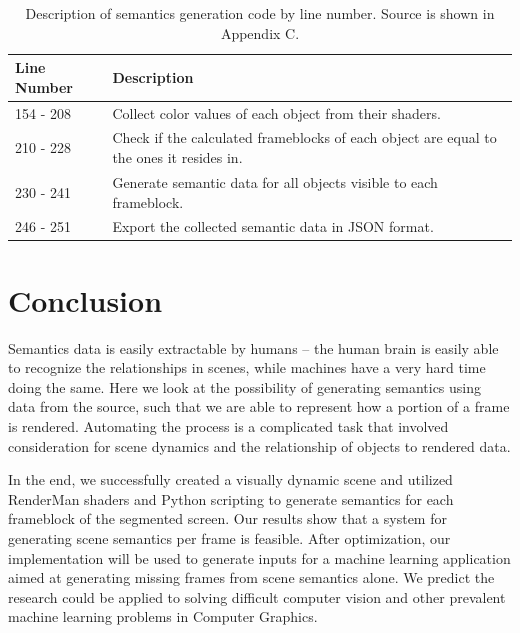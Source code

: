 \documentclass[conference]{IEEEtran}
\begin{document}
\begin{table}[t]
\begin{centering}
\bgroup
\def\arraystretch{1.5}
\begin{tabular}{| m{} | m{} |} 
\hline
Line Number & Description \\ 
\hline
\hline
154 - 208 & Collect color values of each object from their shaders. \\
210 - 228 & Check if the calculated frameblocks of each object are equal to the ones it
resides in. \\
230 - 241 & Generate semantic data for all objects visible to each frameblock. \\
246 - 251 & Export the collected semantic data in JSON format. \\
\hline
\end{tabular}
\caption{Description of semantics generation code by line number.
Source is shown in Appendix C.}
\label{tbl:app_b}
\egroup
\end{centering}
\end{table}

\section{Conclusion}
\label{sec:conclusion}
Semantics data is easily extractable by humans --
the human brain is easily able to recognize the relationships in
scenes, while machines have a very hard time doing the same.
Here we look at the possibility of generating semantics using data from the source,
such that we are able to represent how a portion of a frame is rendered.
Automating the process is a complicated task that
involved consideration for
scene dynamics and the relationship of objects to rendered data.

In the end, we successfully created a visually dynamic scene
and utilized RenderMan shaders and Python scripting
to generate semantics for each frameblock of the segmented screen.
Our results show that a system for generating scene semantics per frame is feasible.
After optimization,
our implementation will be used to generate inputs for a machine learning application
aimed at generating missing frames from scene semantics alone.
We predict the research could be applied to solving difficult
computer vision and other prevalent machine learning problems in Computer Graphics.
\end{document}
